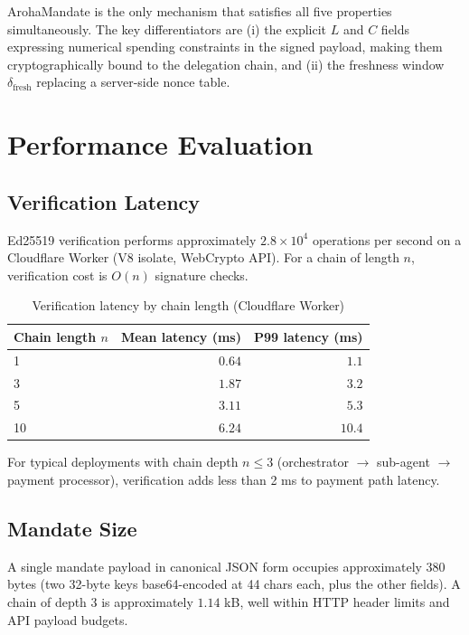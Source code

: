 \documentclass[conference]{IEEEtran}
\begin{document}
ArohaMandate is the only mechanism that satisfies all five
properties simultaneously. The key differentiators are
(i) the explicit $L$ and $C$ fields expressing numerical
spending constraints in the signed payload, making them
cryptographically bound to the delegation chain, and
(ii) the freshness window $\delta_{\text{fresh}}$ replacing
a server-side nonce table.

\section{Performance Evaluation}
\label{sec:eval}

\subsection{Verification Latency}

Ed25519 verification performs approximately $2.8 \times
10^4$ operations per second on a Cloudflare Worker
(V8 isolate, WebCrypto API).  For a chain of length $n$,
verification cost is $O(n)$ signature checks.

\begin{table}[t]
\centering
\caption{Verification latency by chain length (Cloudflare Worker)}
\label{tab:latency}
\begin{tabular}{lrr}
\toprule
Chain length $n$ & Mean latency (ms) & P99 latency (ms) \\
\midrule
1 & $0.64$ & $1.1$ \\
3 & $1.87$ & $3.2$ \\
5 & $3.11$ & $5.3$ \\
10 & $6.24$ & $10.4$ \\
\bottomrule
\end{tabular}
\end{table}

For typical deployments with chain depth $n \leq 3$
(orchestrator $\to$ sub-agent $\to$ payment processor),
verification adds less than 2 ms to payment path latency.

\subsection{Mandate Size}

A single mandate payload in canonical JSON form occupies
approximately $380$ bytes (two 32-byte keys base64-encoded
at 44 chars each, plus the other fields).  A chain of
depth 3 is approximately $1.14$ kB, well within HTTP header
limits and API payload budgets.
\end{document}
